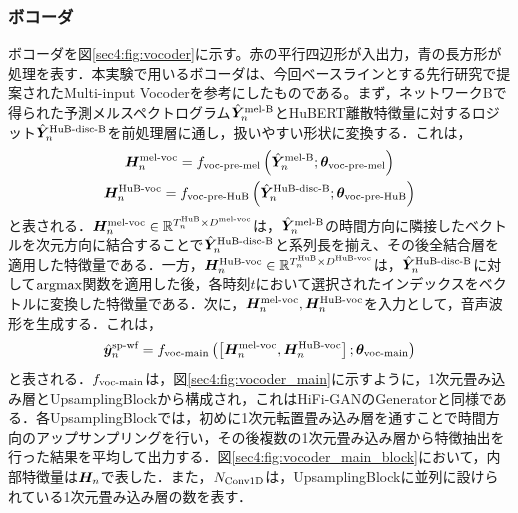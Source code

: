 \subsubsection{ボコーダ}
ボコーダを図\ref{sec4:fig:vocoder}に示す。赤の平行四辺形が入出力，青の長方形が処理を表す．本実験で用いるボコーダは、今回ベースラインとする先行研究\cite{choi2023intelligible}で提案されたMulti-input Vocoderを参考にしたものである。まず，ネットワークBで得られた予測メルスペクトログラム$\hat{\bm{Y}}^{\text{mel-B}}_{n}$とHuBERT離散特徴量に対するロジット$\hat{\bm{Y}}^{\text{HuB-disc-B}}_{n}$を前処理層に通し，扱いやすい形状に変換する．これは，
\begin{gather}
    \bm{H}^{\text{mel-voc}}_{n} = f_{\text{voc-pre-mel}}\left(\hat{\bm{Y}}^{\text{mel-B}}_{n}; \bm{\theta}_{\text{voc-pre-mel}}\right) \\
    \bm{H}^{\text{HuB-voc}}_{n} = f_{\text{voc-pre-HuB}}\left(\hat{\bm{Y}}^{\text{HuB-disc-B}}_{n}; \bm{\theta}_{\text{voc-pre-HuB}}\right)
\end{gather}
と表される．$\bm{H}^{\text{mel-voc}}_{n} \in \mathbb{R}^{T^{\text{HuB}}_{n} \times D^{\text{mel-voc}}}$は，$\hat{\bm{Y}}^{\text{mel-B}}_{n}$の時間方向に隣接したベクトルを次元方向に結合することで$\hat{\bm{Y}}^{\text{HuB-disc-B}}_{n}$と系列長を揃え、その後全結合層を適用した特徴量である．一方，$\bm{H}^{\text{HuB-voc}}_{n} \in \mathbb{R}^{T^{\text{HuB}}_{n} \times D^{\text{HuB-voc}}}$は，$\hat{\bm{Y}}^{\text{HuB-disc-B}}_{n}$に対して$\text{argmax}$関数を適用した後，各時刻$t$において選択されたインデックスをベクトルに変換した特徴量である．次に，$\bm{H}^{\text{mel-voc}}_{n}, \bm{H}^{\text{HuB-voc}}_{n}$を入力として，音声波形を生成する．これは，
\begin{equation}
    \hat{\bm{y}}^{\text{sp-wf}}_{n} = f_{\text{voc-main}}\left(\left[\bm{H}^{\text{mel-voc}}_{n}, \bm{H}^{\text{HuB-voc}}_{n}\right]; \bm{\theta}_{\text{voc-main}}\right)
\end{equation}
と表される．$f_{\text{voc-main}}$は，図\ref{sec4:fig:vocoder_main}に示すように，1次元畳み込み層とUpsamplingBlockから構成され，これはHiFi-GAN\cite{kong2020hifi}のGeneratorと同様である．各UpsamplingBlockでは，初めに1次元転置畳み込み層を通すことで時間方向のアップサンプリングを行い，その後複数の1次元畳み込み層から特徴抽出を行った結果を平均して出力する．図\ref{sec4:fig:vocoder_main_block}において，内部特徴量は$\bm{H}_{n}$で表した．また，$N_{\text{Conv1D}}$は，UpsamplingBlockに並列に設けられている1次元畳み込み層の数を表す．

